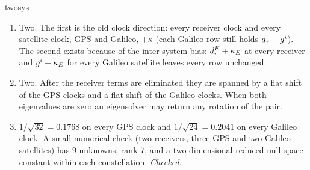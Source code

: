 \begin{answer}{twosys}
\solution
\begin{enumerate}[leftmargin=*, itemsep=1pt]
\item Two. The first is the old clock direction: every receiver clock and every
      satellite clock, GPS and Galileo, $+\kappa$ (each Galileo row still holds $a_r -
      g^i$). The second exists because of the inter-system bias: $d^E_r + \kappa_E$ at
      every receiver and $g^i + \kappa_E$ for every Galileo satellite leaves every row
      unchanged.
\item Two. After the receiver terms are eliminated they are spanned by a flat shift
      of the GPS clocks and a flat shift of the Galileo clocks. When both eigenvalues
      are zero an eigensolver may return any rotation of the pair.
\item $1/\sqrt{32} = 0.1768$ on every GPS clock and $1/\sqrt{24} = 0.2041$ on every
      Galileo clock. A small numerical check (two receivers, three GPS and two
      Galileo satellites) has 9 unknowns, rank 7, and a two-dimensional reduced null
      space constant within each constellation. \emph{Checked.}
\end{enumerate}
\end{answer}

